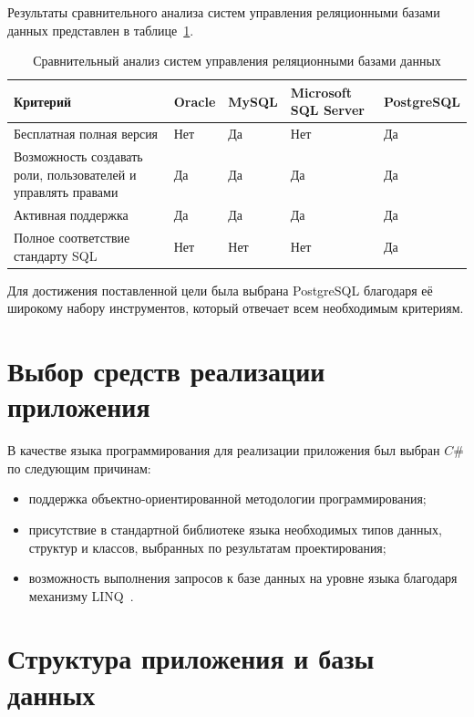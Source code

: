 Результаты сравнительного анализа систем управления реляционными базами данных представлен в таблице~\ref{tbl:subd-compare}.

\newpage

\begin{table}[h]
	\centering
	\caption{Сравнительный анализ систем управления реляционными базами данных}
	\label{tbl:subd-compare}
	\begin{tabularx}{\textwidth}{|p{3.5cm}|X|X|X|X|}
		\hline
		\textbf{Критерий} & \textbf{Oracle} & \textbf{MySQL} & \textbf{Microsoft SQL Server} & \textbf{PostgreSQL} \\
		\hline
		Бесплатная полная версия & Нет & Да & Нет & Да \\
		\hline
		Возможность создавать роли, пользователей и управлять правами & Да & Да & Да & Да \\
		\hline
		Активная поддержка & Да & Да & Да & Да \\
		\hline
		Полное соответствие стандарту SQL & Нет & Нет  & Нет & Да \\
		\hline
	\end{tabularx}
\end{table}

Для достижения поставленной цели была выбрана PostgreSQL благодаря её широкому набору инструментов, который отвечает всем необходимым критериям.

\section{Выбор средств реализации приложения}

В качестве языка программирования для реализации приложения был выбран $C\#$ по следующим причинам:
\begin{itemize}[label=--]
	\item поддержка объектно-ориентированной методологии программирования;
	\item присутствие в стандартной библиотеке языка необходимых типов данных, структур и классов, выбранных по результатам проектирования;
	\item возможность выполнения запросов к базе данных на уровне языка благодаря механизму LINQ~\cite{lit16}.
\end{itemize}

\section{Структура приложения и базы данных}

